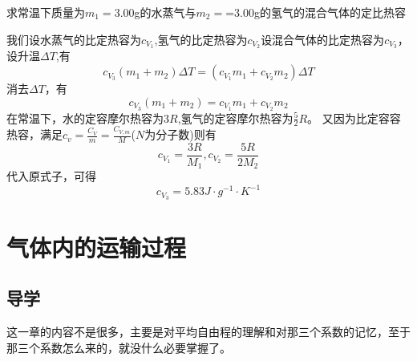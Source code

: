 \documentclass[lang=cn,10pt]{elegantbook}
\begin{document}
	\begin{example}
		求常温下质量为$m_{1}=$3.00g的水蒸气与$m_{2}=$=3.00g的氢气的混合气体的定比热容
	\end{example}
	\begin{solution}
		我们设水蒸气的比定热容为$c_{V_{1}}$,氢气的比定热容为$c_{V_{2}}$设混合气体的比定热容为$c_{V_{3}}$，设升温$\varDelta T$,有
		\begin{equation*}
			c_{V_{3}}(m_{1}+m_{2})\varDelta T=(c_{V_{1}}m_{1}+c_{V_{2}}m_{2})\varDelta T
		\end{equation*}
		消去$\varDelta T$，有
		\begin{equation*}
			c_{V_{3}}(m_{1}+m_{2})=c_{V_{1}}m_{1}+c_{V_{2}}m_{2}
		\end{equation*}
		在常温下，水的定容摩尔热容为$3R$,氢气的定容摩尔热容为$\frac{5}{2}R$。
		又因为比定容容热容，满足$c_{v}=\frac{C_{V}}{m}=\frac{C_{V,m}}{M}$($N$为分子数)则有
		\begin{equation*}
			c_{V_{1}}=\frac{3R}{M_{1}},c_{V_{2}}=\frac{5R}{2M_{2}}
		\end{equation*}
		代入原式子，可得
		\begin{equation*}
			c_{V_{3}}=5.83J\cdot g^{-1}\cdot K^{-1}
		\end{equation*}
		
		\end{solution}
	\chapter{气体内的运输过程}
	\section{导学}
	这一章的内容不是很多，主要是对平均自由程的理解和对那三个系数的记忆，至于那三个系数怎么来的，就没什么必要掌握了。
\end{document}
